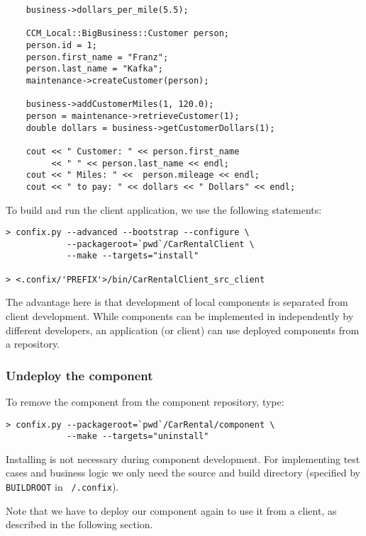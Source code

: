 \begin{small}
\begin{verbatim}
    business->dollars_per_mile(5.5);
    
    CCM_Local::BigBusiness::Customer person;
    person.id = 1;
    person.first_name = "Franz";
    person.last_name = "Kafka";
    maintenance->createCustomer(person);

    business->addCustomerMiles(1, 120.0); 
    person = maintenance->retrieveCustomer(1);
    double dollars = business->getCustomerDollars(1); 

    cout << " Customer: " << person.first_name 
         << " " << person.last_name << endl;
    cout << " Miles: " <<  person.mileage << endl;
    cout << " to pay: " << dollars << " Dollars" << endl;
\end{verbatim}
\end{small}

To build and run the client application, we use the following statements:
\begin{small}
\begin{verbatim}
> confix.py --advanced --bootstrap --configure \
            --packageroot=`pwd`/CarRentalClient \
            --make --targets="install"

> <.confix/'PREFIX'>/bin/CarRentalClient_src_client
\end{verbatim}
\end{small}


The advantage here is that development of local components is separated from
client development. 
While components can be implemented in independently by different developers, an
application (or client) can use deployed components from a repository.

\subsubsection{Undeploy the component}

To remove the component from the component repository, type:

\begin{small}
\begin{verbatim}
> confix.py --packageroot=`pwd`/CarRental/component \
            --make --targets="uninstall" 
\end{verbatim}
\end{small}

Installing is not necessary during component development. 
For implementing test cases and business logic we only need the source and
build directory (specified by {\tt BUILDROOT} in {\tt ~/.confix}).
 
Note that we have to deploy our component again to use it from a client,
as described in the following section. 